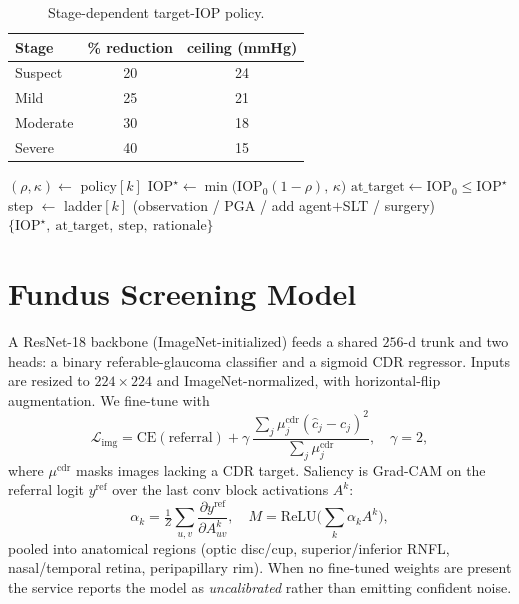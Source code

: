 \documentclass[10pt,twocolumn]{article}
\begin{document}
\begin{table}[t]
\centering
\caption{Stage-dependent target-IOP policy.}
\label{tab:targets}
\small
\begin{tabular}{lcc}
\toprule
Stage & \% reduction & ceiling (mmHg) \\
\midrule
Suspect & 20 & 24 \\ Mild & 25 & 21 \\ Moderate & 30 & 18 \\ Severe & 40 & 15 \\
\bottomrule
\end{tabular}
\end{table}

\begin{algorithm}[t]
\caption{Decision support (target IOP $+$ ladder)}
\label{alg:dss}
\begin{algorithmic}[1]
\State $(\rho,\kappa)\gets$ policy$[k]$ 
\State $\mathrm{IOP}^\star \gets \min\big(\mathrm{IOP}_0(1-\rho),\,\kappa\big)$
\State $\text{at\_target}\gets \mathrm{IOP}_0 \le \mathrm{IOP}^\star$
\State step $\gets$ ladder$[k]$ (observation / PGA / add agent$+$SLT / surgery)
\State \Return $\{\mathrm{IOP}^\star,\ \text{at\_target},\ \text{step},\ \text{rationale}\}$
\end{algorithmic}
\end{algorithm}

\section{Fundus Screening Model}
\label{sec:fundus}
A ResNet-18 backbone (ImageNet-initialized) feeds a shared $256$-d trunk and two
heads: a binary referable-glaucoma classifier and a sigmoid CDR regressor. Inputs are
resized to $224{\times}224$ and ImageNet-normalized, with horizontal-flip
augmentation. We fine-tune with
\begin{equation}
\mathcal{L}_{\text{img}} = \mathrm{CE}(\text{referral})
+ \gamma\,\frac{\sum_j \mu^{\text{cdr}}_j (\hat{c}_j-c_j)^2}{\sum_j \mu^{\text{cdr}}_j},
\quad \gamma{=}2,
\end{equation}
where $\mu^{\text{cdr}}$ masks images lacking a CDR target. Saliency is Grad-CAM on
the referral logit $y^{\text{ref}}$ over the last conv block activations $A^k$:
\begin{equation}
\alpha_k = \tfrac{1}{Z}\textstyle\sum_{u,v}\frac{\partial y^{\text{ref}}}{\partial A^k_{uv}},
\quad
M = \mathrm{ReLU}\!\Big(\textstyle\sum_k \alpha_k A^k\Big),
\end{equation}
pooled into anatomical regions (optic disc/cup, superior/inferior RNFL, nasal/temporal
retina, peripapillary rim). When no fine-tuned weights are present the service reports
the model as \emph{uncalibrated} rather than emitting confident noise.
\end{document}
